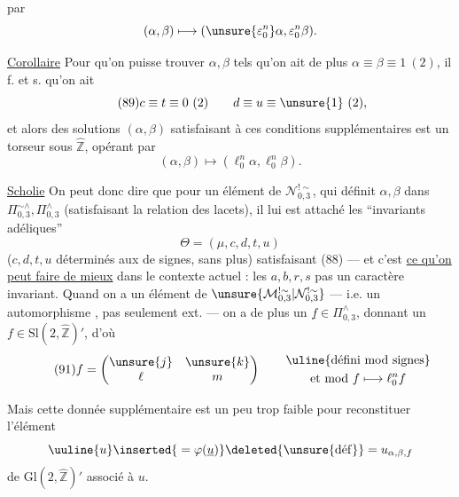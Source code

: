 

par
\[
 (\alpha,\beta)\longmapsto
 (\unsure{\varepsilon_0^n}\alpha,\varepsilon_0^n\beta).
\]

\uline{Corollaire} Pour qu'on puisse trouver $\alpha,\beta$ tels qu'on ait de plus $\alpha\equiv\beta\equiv1\ (2)$, il f. et s. qu'on ait
\[
\tag{89}
 c\equiv t\equiv0\ (2)\qquad d\equiv u\equiv\unsure{1}\ (2),
\]
et alors  des solutions $(\alpha,\beta)$ satisfaisant à ces conditions supplémentaires est un torseur sous $\widehat{\mathbb Z}$, opérant par
\[
 (\alpha,\beta)\longmapsto(\ell_0^n\alpha,\ell_0^n\beta).
\]

\uline{Scholie} On peut donc dire que pour un élément  de $\mathcal N_{0,3}^{!\sim}$, qui définit  $\alpha,\beta$ dans $\Pi_{0,3}^{\sim\wedge},\Pi_{0,3}^{\wedge}$  (satisfaisant la relation des lacets), il lui est attaché les ``invariants adéliques'' 
\[
\tag{90}
 \Theta=(\mu,c,d,t,u)
\]
($c,d,t,u$ déterminés aux  de signes, sans plus) satisfaisant (88) --- et c'est \uline{ce qu'on peut faire de mieux} dans le contexte actuel : les $a,b,r,s$  pas un caractère invariant. Quand on a un élément  de $\unsure{\mathcal M_{0,3}^{!\sim}|\mathcal N_{0,3}^{!\sim}}$ --- i.e. un automorphisme , pas seulement ext. --- on a de plus un $\underline f\in\Pi_{0,3}^{\wedge}$, donnant un $f\in\mathrm{Sl}(2,\widehat{\mathbb Z})'$, d'où
\[
\tag{91}
 f=\begin{pmatrix}\unsure{j}&\unsure{k}\\ \ell&m\end{pmatrix}
 \qquad\begin{gathered}\uline{\text{défini mod signes}}\\
 \text{et mod } f\longmapsto\ell_0^n f
 \end{gathered}
\]



Mais cette donnée supplémentaire est un peu trop
faible pour reconstituer  l'élément
\[
 \uuline{u}\inserted{{}=\varphi(\underline u)}\deleted{\unsure{\mathrm{d\acute{e}f}}}
 =u_{\alpha,\beta,f}
\]
de $\mathrm{Gl}(2,\widehat{\mathbb Z})'$ associé à $u$.

